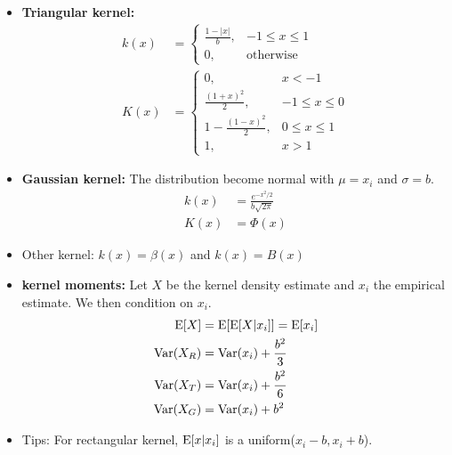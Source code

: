 \documentclass[10pt, french]{article}
\begin{document}
\begin{multicols*}{3}
\begin{itemize}[align=left,leftmargin=*]
    \item \textbf{Triangular kernel:}
    \begin{align*}
        k(x) &=
            \left\{
                \begin{array}{cc}
                    \frac{1 - |x|}{b}, & -1 \leq x \leq 1 \\
                    0,   & \mathrm{otherwise}
                \end{array}
            \right. \\
        K(x) &=
        \left\{
            \begin{array}{cc}
                0, & x < -1 \\
                \frac{(1+x)^2}{2}, & -1 \leq x \leq 0 \\
                1 - \frac{(1-x)^2}{2}, & 0 \leq x \leq 1 \\
                1,   & x > 1
            \end{array}
        \right.
    \end{align*}
    \item \textbf{Gaussian kernel:} The distribution become normal with $\mu=x_i$ and $\sigma=b$.
    \begin{align*}
        k(x) &= \frac{e^{-x^2/2}}{b\sqrt{2\pi}} \\
        K(x) &= \Phi(x)
    \end{align*}
    \item Other kernel: $k(x)=\beta(x)$ and $k(x) = B(x)$
    \item \textbf{kernel moments:} Let $X$ be the kernel density estimate and $x_i$ the empirical estimate. We then condition on $x_i$.
    \begin{align*}
        \mathrm{E} {\left[ X \right]} &= \mathrm{E} {\left[ \mathrm{E} {\left[ X|x_i \right]} \right]} = \mathrm{E} {\left[ x_i \right]} \\
        \mathrm{Var} {\left( X_R \right)} &= \mathrm{Var} {\left( x_i \right)} + \frac{b^2}{3} \\
        \mathrm{Var} {\left( X_T \right)} &= \mathrm{Var} {\left( x_i \right)} + \frac{b^2}{6} \\
        \mathrm{Var} {\left( X_G \right)} &= \mathrm{Var} {\left( x_i \right)} + b^2
    \end{align*}
\item Tips: For rectangular kernel, $\mathrm{E} {\left[ x|x_i \right]}$ is a uniform($x_i-b,x_i+b$).
\end{itemize}


\end{multicols*}
\end{document}
